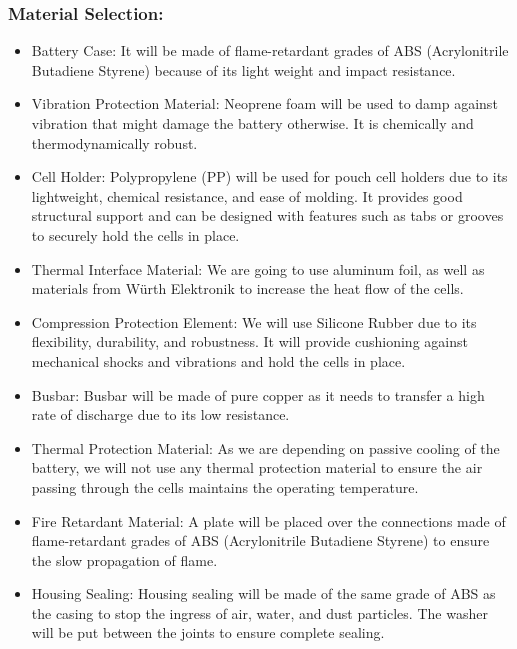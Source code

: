 \subsubsection{Material Selection:}
\begin{itemize}

\item Battery Case: It will be made of flame-retardant grades of ABS (Acrylonitrile Butadiene Styrene) because of its light weight and impact resistance. 

\item Vibration Protection Material: Neoprene foam will be used to damp against vibration that might damage the battery otherwise. It is chemically and thermodynamically robust.

\item Cell Holder: Polypropylene (PP) will be used for pouch cell holders due to its lightweight, chemical resistance, and ease of molding. It provides good structural support and can be designed with features such as tabs or grooves to securely hold the cells in place.

\item Thermal Interface Material: We are going to use aluminum foil, as well as materials from Würth Elektronik to increase the heat flow of the cells.

\item Compression Protection Element: We will use Silicone Rubber due to its flexibility, durability, and robustness. It will provide cushioning against mechanical shocks and vibrations and hold the cells in place.

\item Busbar: Busbar will be made of pure copper as it needs to transfer a high rate of discharge due to its low resistance.

\item Thermal Protection Material: As we are depending on passive cooling of the battery, we will not use any thermal protection material to ensure the air passing through the cells maintains the operating temperature.

\item Fire Retardant Material: A plate will be placed over the connections made of flame-retardant grades of ABS (Acrylonitrile Butadiene Styrene) to ensure the slow propagation of flame.

\item Housing Sealing: Housing sealing will be made of the same grade of ABS as the casing to stop the ingress of air, water, and dust particles. The washer will be put between the joints to ensure complete sealing.
\end{itemize}

